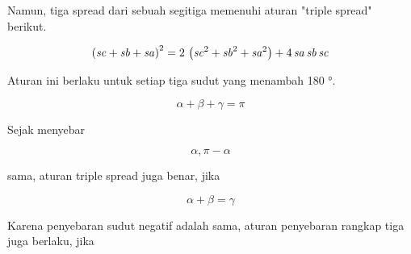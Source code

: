 \documentclass{article}
\begin{document}
\begin{eulernotebook}
\begin{eulercomment}
\begin{eulercomment}
\begin{eulercomment}
Namun, tiga spread dari sebuah segitiga memenuhi aturan "triple
spread" berikut.
\end{eulercomment}
\begin{eulerformula}
\[
\left({\it sc}+{\it sb}+{\it sa}\right)^2=2\,\left({\it sc}^2+  {\it sb}^2+{\it sa}^2\right)+4\,{\it sa}\,{\it sb}\,{\it sc}
\]
\end{eulerformula}
\begin{eulercomment}
Aturan ini berlaku untuk setiap tiga sudut yang menambah 180 °.

\end{eulercomment}
\begin{eulerformula}
\[
\alpha+\beta+\gamma=\pi
\]
\end{eulerformula}
\begin{eulercomment}
Sejak menyebar

\end{eulercomment}
\begin{eulerformula}
\[
\alpha, \pi-\alpha
\]
\end{eulerformula}
\begin{eulercomment}
sama, aturan triple spread juga benar, jika

\end{eulercomment}
\begin{eulerformula}
\[
\alpha+\beta=\gamma
\]
\end{eulerformula}
\begin{eulercomment}
Karena penyebaran sudut negatif adalah sama, aturan penyebaran rangkap
tiga juga berlaku, jika


\end{eulercomment}
\end{eulercomment}
\end{eulercomment}
\end{eulernotebook}
\end{document}
